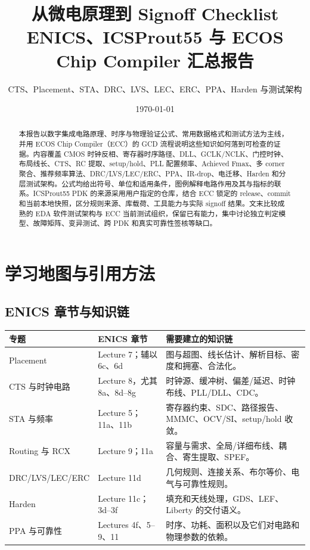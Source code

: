 \documentclass[UTF8,a4paper,11pt,fontset=fandol]{ctexart}
\title{从微电原理到 Signoff Checklist\\
ENICS、ICSProut55 与 ECOS Chip Compiler 汇总报告}
\author{CTS、Placement、STA、DRC、LVS、LEC、ERC、PPA、Harden 与测试架构}
\date{\today}
\numberwithin{equation}{section}
\begin{document}
\maketitle

\begin{abstract}
本报告以数字集成电路原理、时序与物理验证公式、常用数据格式和测试方法为主线，并用 ECOS Chip Compiler（ECC）的 GCD 流程说明这些知识如何落到可检查的证据。内容覆盖 CMOS 时钟反相、寄存器时序路径、DLL、GCLK/NCLK、门控时钟、布局线长、CTS、RC 提取、setup/hold、PLL 配置频率、Achieved Fmax、多 corner 聚合、推荐频率算法、DRC/LVS/LEC/ERC、PPA、IR-drop、电迁移、Harden 和分层测试架构。公式均给出符号、单位和适用条件，图例解释电路作用及其与指标的联系。ICSProut55 PDK 的来源采用用户指定的仓库，结合 ECC 锁定的 release、commit 和当前本地快照，区分规则来源、库载荷、工具能力与实际 signoff 结果。文末比较成熟的 EDA 软件测试架构与 ECC 当前测试组织，保留已有能力，集中讨论独立判定模型、故障矩阵、变异测试、跨 PDK 和真实可靠性签核等缺口。
\end{abstract}

\tableofcontents

\section{学习地图与引用方法}

\subsection{ENICS 章节与知识链}

\begin{center}
\begin{tabularx}{\textwidth}{p{}p{}X}
\toprule
专题 & ENICS 章节 & 需要建立的知识链 \\
\midrule
Placement & Lecture 7；辅以 6c、6d & 图与超图、线长估计、解析目标、密度和拥塞、合法化。 \\
CTS 与时钟电路 & Lecture 8，尤其 8a、8d--8g & 时钟源、缓冲树、偏差/延迟、时钟布线、PLL/DLL、CDC。 \\
STA 与频率 & Lecture 5；11a、11b & 寄存器约束、SDC、路径报告、MMMC、OCV/SI、setup/hold 收敛。 \\
Routing 与 RCX & Lecture 9；11a & 容量与需求、全局/详细布线、耦合、寄生提取、SPEF。 \\
DRC/LVS/LEC/ERC & Lecture 11d & 几何规则、连接关系、布尔等价、电气与可靠性规则。 \\
Harden & Lecture 11c；3d--3f & 填充和天线处理，GDS、LEF、Liberty 的交付语义。 \\
PPA 与可靠性 & Lectures 4f、5--9、11 & 时序、功耗、面积以及它们对电路和物理参数的依赖。 \\
\bottomrule
\end{tabularx}
\end{center}
\end{document}
